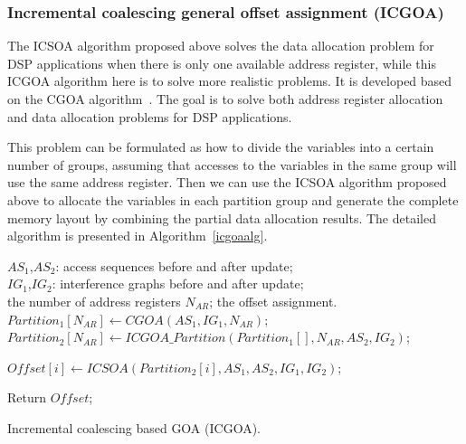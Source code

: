 \subsubsection{Incremental coalescing general offset assignment (ICGOA)}
The ICSOA algorithm proposed above solves the data allocation problem for DSP applications when there is only one available address register, while this ICGOA algorithm here is to solve more realistic problems. It is developed based on the CGOA algorithm~\cite{related:ottoni}. The goal is to solve both address register allocation and data allocation problems for DSP applications.

This problem can be formulated as how to divide the variables into a certain number of groups, assuming that accesses to the variables in the same group will use the same address register.
Then we can use the ICSOA algorithm proposed above to allocate the variables in each partition group and generate the complete memory layout by combining the partial data allocation
results. The detailed algorithm is presented in Algorithm~\ref{icgoaalg}. 

\begin{algorithm}[htbp]
\singlespace
\begin{algorithmic}[1]
\singlespace
\REQUIRE $\textit{AS}_1$,$\textit{AS}_2$: access sequences before and after update; \\
				 $\textit{IG}_1$,$\textit{IG}_2$: interference graphs before and after update;\\
				 the number of address registers $N_{AR}$;
\ENSURE the offset assignment.\\
\STATE $\textit{Partition}_1[N_{AR}] \leftarrow \textit{CGOA}(\textit{AS}_1,\textit{IG}_1,N_{AR})$;\\
\STATE $\textit{Partition}_2[N_{AR}] \leftarrow  \textit{ICGOA}\_\textit{Partition}(\textit{Partition}_1[],N_{AR},\textit{AS}_2,\textit{IG}_2)$;

\STATE $\textit{Offset}[i] \leftarrow ICSOA(\textit{Partition}_2[i],\textit{AS}_1,\textit{AS}_2,\textit{IG}_1,\textit{IG}_2)$;
\ENDFOR

\STATE Return $\textit{Offset}$;
\caption{Incremental coalescing based GOA (ICGOA).}
\label{icgoaalg}
\end{algorithmic}
\end{algorithm}

